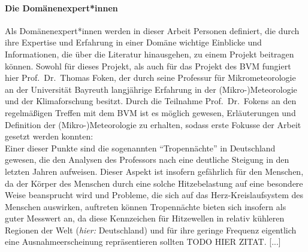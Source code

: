 \paragraph{Die Domänenexpert*innen}
Als Domänenexpert*innen werden in dieser Arbeit Personen definiert, die durch ihre Expertise und Erfahrung in einer Domäne wichtige Einblicke und Informationen, die über die Literatur hinausgehen, zu einem Projekt beitragen können. Sowohl für dieses Projekt, als auch für das Projekt des \ac{BVM} fungiert hier Prof.\ Dr.\ Thomas Foken, der durch seine Professur für Mikrometeorologie an der Universität Bayreuth langjährige Erfahrung in der (Mikro-)Meteorologie und der Klimaforschung besitzt. Durch die Teilnahme Prof.\ Dr.\ Fokens an den regelmäßigen Treffen mit dem \ac{BVM} ist es möglich gewesen, Erläuterungen und Definition der (Mikro-)Meteorologie zu erhalten, sodass erste Fokusse der Arbeit gesetzt werden konnten: \\ Einer dieser Punkte sind die sogenannten \enquote{Tropennächte} in Deutschland gewesen, die den Analysen des Professors nach eine deutliche Steigung in den letzten Jahren aufweisen. Dieser Aspekt ist insofern gefährlich für den Menschen, da der Körper des Menschen durch eine solche Hitzebelastung auf eine besondere Weise beansprucht wird und Probleme, die sich auf das Herz-Kreislaufsystem des Menschen auswirken, auftreten können \cite{Umweltbundesamt2023Hitze}
Tropennächte bieten sich insofern als guter Messwert an, da diese Kennzeichen für Hitzewellen in relativ kühleren Regionen der Welt (\textit{hier:} Deutschland) und für ihre geringe Frequenz eigentlich eine Ausnahmeerscheinung repräsentieren sollten TODO HIER ZITAT. [...]

